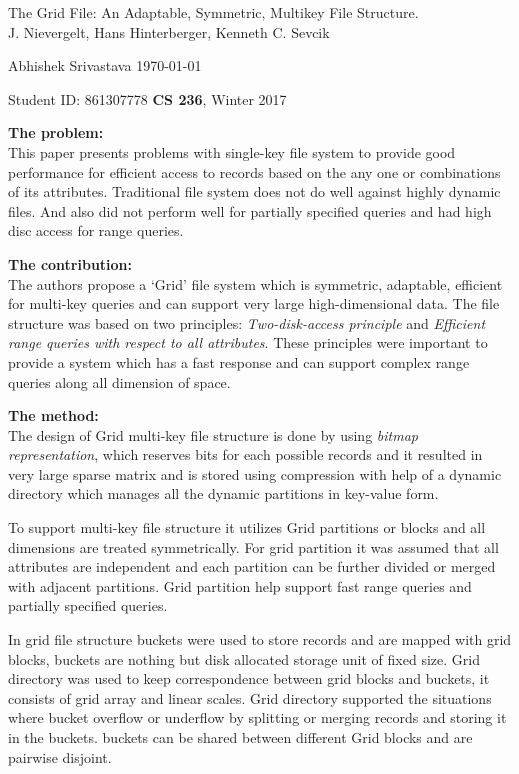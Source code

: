 \documentclass[a4paper,12pt, twoside]{article}
\renewcommand{\maketitle}{%
 	\Large
 	\begin{center}
 	The Grid File: An Adaptable, Symmetric, Multikey File Structure.\\	
 	\normalsize J. Nievergelt, Hans Hinterberger, Kenneth C. Sevcik
 	\end{center}
 
 	\Large
	Abhishek Srivastava
	\hfill
	\normalsize
	\today
 	\par
 	Student ID: 861307778
 	\hfill
 	\textbf{CS 236}, Winter 2017
 	\par 	
 	\hrulefill
 	\par
 	}
\begin{document}
\thispagestyle{empty}
	
\maketitle

\textbf{The problem:}\\
This paper presents problems with single-key file system to provide good performance for efficient access to records based on the any one or combinations of its attributes. Traditional file system does not do well against highly dynamic files. And also did not perform well for partially specified queries and had high disc access for range queries.

\textbf{The contribution:}\\
The authors propose a `Grid' file system which is symmetric, adaptable, efficient for multi-key queries and can support very large high-dimensional data. The file structure was based on two principles: \emph{Two-disk-access principle} and \emph{Efficient range queries with respect to all attributes}. These principles were important to provide a system which has a fast response and can support complex range queries along all dimension of space. 

\textbf{The method:}\\
The design of Grid multi-key file structure is done by using \emph{bitmap representation},  which reserves bits for each possible records and it resulted in very large sparse matrix and is stored using compression with help of a dynamic directory which manages all the dynamic partitions in key-value form.

To support multi-key file structure it utilizes Grid partitions or blocks and all dimensions are treated symmetrically. For grid partition it was assumed that all attributes are independent and each partition can be further divided or merged with adjacent partitions. Grid partition help support fast range queries and partially specified queries.

In grid file structure buckets were used to store records and are mapped with grid blocks, buckets are nothing but disk allocated storage unit of fixed size. Grid directory was used to keep correspondence between grid blocks and buckets, it consists of grid array and linear scales. Grid directory supported the situations where bucket overflow or underflow by splitting or merging records  and storing it in the buckets. buckets can be shared between different Grid blocks and are pairwise disjoint.
\end{document}
